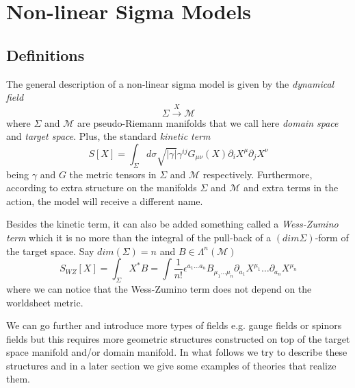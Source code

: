\documentclass[a4paper,12pt]{article}
\numberwithin{equation}{section}
\numberwithin{thm}{section}
\numberwithin{exm}{section}
\newcommand{\M}{\mathcal M}
\newcommand{\p}{\partial}
\newcommand{\os}[2]{\overset{#1}{#2}}
\newcommand{\<}{{\langle}}
\renewcommand{\>}{{\rangle}}
\newcommand{\e}{{\epsilon}}
\newcommand{\g}{{\gamma}}
\renewcommand{\L}{{\Lambda}}
\newcommand{\m}{{\mu}}
\newcommand{\n}{{\nu}}
\newcommand{\s}{{\sigma}}
\renewcommand{\S}{{\Sigma}}
\begin{document}
\section{Non-linear Sigma Models}

\subsection{Definitions}
The general description of a non-linear sigma model is given by the {\it dynamical field}
	\begin{equation}
	\Sigma\os{X}{\longrightarrow}\M
	\end{equation}
where $\Sigma$ and $\M$ are pseudo-Riemann manifolds that we call here {\it domain space} and {\it target space}. Plus, the standard {\it kinetic term}
	\begin{equation}
	S[X] = \int_\S d\s \sqrt{| \g|}\g^{ij} G_{\m\n}(X) \p_i X^\m \p_j X^\n
	\end{equation}
being $\g$ and $G$ the metric tensors in $\S$ and $\M$ respectively. Furthermore, according to extra structure on the manifolds $\S$ and $\M$ and extra terms in the action, the model will receive a different name.

Besides the kinetic term, it can also be added something called a {\it Wess-Zumino term} which it is no more than the integral of the pull-back of a $(dim\S)$-form of the target space. Say $dim(\S) = n$ and $B\in\L^n(\M)$
	\begin{equation}
	S_{WZ}[X] = \int_\S X^* B = \int \frac{1}{n!} \e^{a_1\ldots a_n}B_{\m_1\ldots\m_n} \p_{a_1} X^{\m_1}\ldots \p_{a_n} X^{\m_n}
	\end{equation}
where we can notice that the Wess-Zumino term does not depend on the worldsheet metric.

We can go further and introduce more types of fields e.g. gauge fields or spinors fields but this requires more geometric structures constructed on top of the target space manifold and/or domain manifold. In what follows we try to describe these structures and in a later section we give some examples of theories that realize them.
\end{document}
